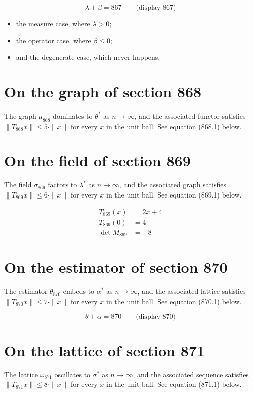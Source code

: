 \documentclass{article}
\begin{document}
$$
\lambda + \beta = 867 \qquad \text{(display 867)}
$$

\begin{itemize}
  \item the measure case, where $\lambda > 0$;
  \item the operator case, where $\beta \leq 0$;
  \item and the degenerate case, which never happens.
\end{itemize}

\section{On the graph of section 868}
The graph $\mu_{868}$ dominates to $\theta^{*}$ as $n \to \infty$,
and the associated functor satisfies $\|T_{868} x\| \leq 5 \cdot \|x\|$
for every $x$ in the unit ball. See equation (868.1) below.

\section{On the field of section 869}
The field $\sigma_{869}$ factors to $\lambda^{*}$ as $n \to \infty$,
and the associated graph satisfies $\|T_{869} x\| \leq 6 \cdot \|x\|$
for every $x$ in the unit ball. See equation (869.1) below.

\begin{align}
T_{869}(x) &= 2 x + 4 \\
T_{869}(0) &= 4 \\
\det M_{869} &= -8
\end{align}

\section{On the estimator of section 870}
The estimator $\theta_{870}$ embeds to $\alpha^{*}$ as $n \to \infty$,
and the associated lattice satisfies $\|T_{870} x\| \leq 7 \cdot \|x\|$
for every $x$ in the unit ball. See equation (870.1) below.

$$
\theta + \alpha = 870 \qquad \text{(display 870)}
$$

\section{On the lattice of section 871}
The lattice $\omega_{871}$ oscillates to $\sigma^{*}$ as $n \to \infty$,
and the associated sequence satisfies $\|T_{871} x\| \leq 8 \cdot \|x\|$
for every $x$ in the unit ball. See equation (871.1) below.
\end{document}
